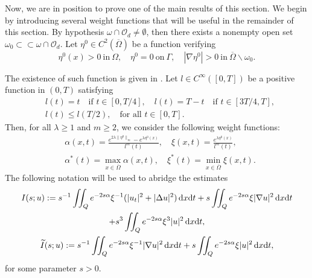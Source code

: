 \documentclass{aims}
\theoremstyle{definition}
\def\dx{\,\textnormal{d}x}
\def\dt{\textnormal{d}t}
\begin{document}
Now, we are in position to prove one of the main results of this section. We begin by introducing several weight functions that will be useful in the remainder of this section. By hypothesis $\omega\cap\mathcal O_d\neq \emptyset$, then there exists a nonempty open set $\omega_0\subset\subset\omega\cap\mathcal O_d$. Let $\eta^0\in C^2(\overline\Omega)$ be a function verifying
%
\begin{equation}\label{constr_1}
\eta^0(x)>0 \ \text{in} \ \Omega, \quad \eta^0=0 \ \text{on} \ \Gamma, \quad |\nabla\eta^0|>0 \ \text{in} \ \overline{\Omega}\backslash\omega_0.
\end{equation}
%

The existence of such function is given in \cite{fursi}. Let $l\in C^\infty([0,T])$ be a positive function in $(0,T)$ satisfying 
%
\begin{equation*}
\begin{split}
&l(t)=t \quad \text{if } t\in [0,T/4], \quad l(t)=T-t \quad \text{if } t\in [3T/4,T], \\
&l(t)\leq l(T/2), \quad \text{for all } t\in[0,T]. 
\end{split}
\end{equation*}
%
Then, for all $\lambda\geq 1$ and $m\geq 2$, we consider the following weight functions:
%
\begin{equation}\label{weights_l} 
\begin{split}
&\alpha(x,t)= \frac{e^{2\lambda\|\eta^0\|_\infty}-e^{\lambda\eta^0(x)}}{l^m(t)}, \quad \xi(x,t)=\frac{e^{\lambda \eta^0(x)}}{l^m(t)}, \\
&\alpha^*(t)=\max_{x\in\overline{\Omega}}\alpha(x,t), \quad \xi^*(t)=\min_{x\in\overline\Omega} \xi(x,t).
\end{split}
\end{equation}
%
The following notation will be used to abridge the estimates
%
\begin{equation*} 
\begin{gathered}
I(s;u):=s^{-1}\iint_{Q}e^{-2s\alpha}\xi^{-1}(|u_t|^2+|\Delta u|^2)\dx\dt+s\iint_Qe^{-2s\alpha}\xi|\nabla u|^2\dx\dt\\+s^3\iint_Qe^{-2s\alpha}\xi^3|u|^2\dx\dt, \\
\widetilde I(s;u):=s^{-1}\iint_{Q}e^{-2s\alpha}\xi^{-1}|\nabla u|^2\dx\dt+s\iint_{Q}e^{-2s\alpha}\xi |u|^2\dx\dt,
\end{gathered}
\end{equation*}
%
for some parameter $s>0$. 
\end{document}
